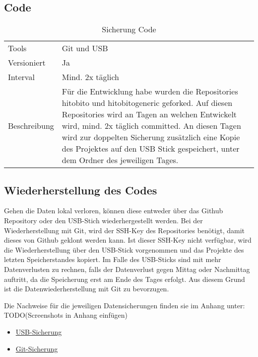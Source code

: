 \newpage

\subsection{Code}
\begin{table}[h!]
    \begin{tabular}{|L{0.4\textwidth}|L{0.5\textwidth}|}
        \hline
          \\[12pt]
        \hline
        Tools & Git und USB \\
        \hline
        Versioniert & Ja \\
        \hline
        Interval & Mind. 2x täglich \\
        \hline
        Beschreibung & Für die Entwicklung habe wurden die Repositories hitobito und hitobito\-generic geforked.
        Auf diesen Repositories wird an Tagen an welchen Entwickelt wird, mind. 2x täglich committed. An diesen Tagen
        wird zur doppelten Sicherung zusätzlich eine Kopie des Projektes auf den USB Stick gespeichert, unter dem Ordner des jeweiligen Tages. \\
      \hline
      \end{tabular}
      \caption{Sicherung Code}
\end{table}

\subsection{Wiederherstellung des Codes}
Gehen die Daten lokal verloren, können diese entweder über das Github Repository oder den USB-Stich wiederhergestellt werden.
Bei der Wiederherstellung mit Git, wird der SSH-Key des Repositories benötigt, damit dieses von Github geklont werden kann. Ist
dieser SSH-Key nicht verfügbar, wird die Wiederherstellung über den USB-Stick vorgenommen und das Projekte des letzten Speicherstandes
kopiert. Im Falle des USB-Sticks sind mit mehr Datenverlusten zu rechnen, falls der Datenverlust gegen Mittag oder Nachmittag auftritt, da
die Speicherung erst am Ende des Tages erfolgt. Aus diesem Grund ist die Datenwiederherstellung mit Git zu bevorzugen.

Die Nachweise für die jeweiligen Datensicherungen finden sie im Anhang unter: TODO(Screenshots in Anhang einfügen)
\begin{itemize}
    \item \hyperref[sec:savusb]{USB-Sicherung}
    \item \hyperref[sec:savgit]{Git-Sicherung}
\end{itemize}

